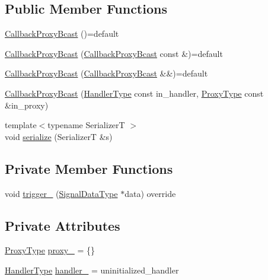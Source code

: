 \subsection*{Public Member Functions}
\begin{DoxyCompactItemize}
\item 
\hyperlink{structvt_1_1pipe_1_1callback_1_1_callback_proxy_bcast_a0f65df639ce4c3a9760b50107defbcad}{Callback\+Proxy\+Bcast} ()=default
\item 
\hyperlink{structvt_1_1pipe_1_1callback_1_1_callback_proxy_bcast_a196de6268c374af67345657d9cb2a8d4}{Callback\+Proxy\+Bcast} (\hyperlink{structvt_1_1pipe_1_1callback_1_1_callback_proxy_bcast}{Callback\+Proxy\+Bcast} const \&)=default
\item 
\hyperlink{structvt_1_1pipe_1_1callback_1_1_callback_proxy_bcast_adbcbe9ba02478e813d43b53b26ffedd0}{Callback\+Proxy\+Bcast} (\hyperlink{structvt_1_1pipe_1_1callback_1_1_callback_proxy_bcast}{Callback\+Proxy\+Bcast} \&\&)=default
\item 
\hyperlink{structvt_1_1pipe_1_1callback_1_1_callback_proxy_bcast_a8a388f5783aaa0e2fd0809523e672adb}{Callback\+Proxy\+Bcast} (\hyperlink{namespacevt_af64846b57dfcaf104da3ef6967917573}{Handler\+Type} const in\+\_\+handler, \hyperlink{structvt_1_1pipe_1_1callback_1_1_callback_proxy_bcast_a27c62cb9cbd1dcd3f135dcd98d98c991}{Proxy\+Type} const \&in\+\_\+proxy)
\item 
{\footnotesize template$<$typename SerializerT $>$ }\\void \hyperlink{structvt_1_1pipe_1_1callback_1_1_callback_proxy_bcast_acb68ed7d028b9286adb5758f680258cf}{serialize} (SerializerT \&s)
\end{DoxyCompactItemize}
\subsection*{Private Member Functions}
\begin{DoxyCompactItemize}
\item 
void \hyperlink{structvt_1_1pipe_1_1callback_1_1_callback_proxy_bcast_a6ec265f95247ccdb1e2dcca909823ae8}{trigger\+\_\+} (\hyperlink{structvt_1_1pipe_1_1callback_1_1_callback_proxy_bcast_ae26574a2b9198a4b4e427bbaab76de53}{Signal\+Data\+Type} $\ast$data) override
\end{DoxyCompactItemize}
\subsection*{Private Attributes}
\begin{DoxyCompactItemize}
\item 
\hyperlink{structvt_1_1pipe_1_1callback_1_1_callback_proxy_bcast_a27c62cb9cbd1dcd3f135dcd98d98c991}{Proxy\+Type} \hyperlink{structvt_1_1pipe_1_1callback_1_1_callback_proxy_bcast_ac10679541d8f497b5c2440e5c780aab2}{proxy\+\_\+} = \{\}
\item 
\hyperlink{namespacevt_af64846b57dfcaf104da3ef6967917573}{Handler\+Type} \hyperlink{structvt_1_1pipe_1_1callback_1_1_callback_proxy_bcast_a586222031b5cc4c5e3bd77655331c527}{handler\+\_\+} = uninitialized\+\_\+handler
\end{DoxyCompactItemize}
